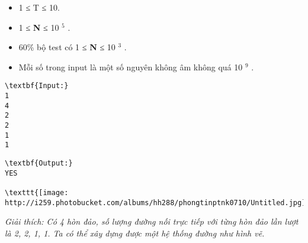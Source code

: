 \begin{itemize}
	\item 1 ≤ T ≤ 10.
	\item 1 ≤ \textbf{ N } ≤ 10 $^ 5 $ .
	\item 60\% bộ test có 1 ≤ \textbf{ N } ≤ 10 $^ 3 $ .
	\item Mỗi số trong input là một số nguyên không âm không quá 10 $^ 9 $ .
\end{itemize}
\begin{verbatim}
\textbf{Input:}
1
4
2
2
1
1\end{verbatim}
\begin{verbatim}
\textbf{Output:}
YES

\texttt{[image: http://i259.photobucket.com/albums/hh288/phongtinptnk0710/Untitled.jpg]}\end{verbatim}

\emph{Giải thích: Có 4 hòn đảo, số lượng đường nối trực tiếp với từng hòn đảo lần lượt là 2, 2, 1, 1. Ta có thể xây dựng được một hệ thống đường như hình vẽ. }